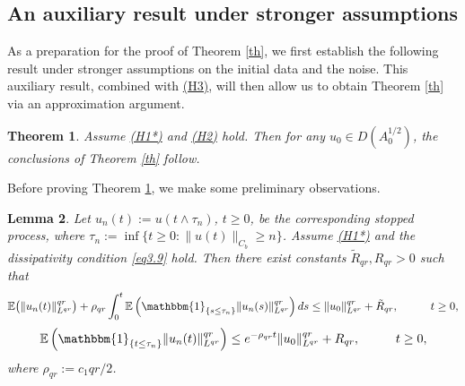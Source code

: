 \documentclass[10pt]{article}
\numberwithin{figure}{section}
\numberwithin{equation}{section}
\newtheorem{theorem}{Theorem}[section]
\newtheorem{lemma}[theorem]{Lemma}
\newcommand{\0}{{\theta}}
\def\O{\Theta}
\def\~{\tilde}
\def\E{\mathbb{E}}
\def\Hs{\hspace{1cm}}\def\hs{\hspace{0.5cm}}
\begin{document}




\subsection{An auxiliary result under stronger assumptions}
As a preparation for the proof of Theorem \ref{th}, we first establish the following result under stronger assumptions on the initial data and the noise. This auxiliary result, combined with \hyperref[H3]{(H3)}, will then allow us to obtain Theorem \ref{th} via an approximation argument.

\begin{theorem}\label{th:global}
Assume \hyperref[H1*]{(H1*)} and \hyperref[H2]{(H2)} hold.
Then for any $u_0 \in D(A_0^{1/2})$, the conclusions of Theorem \ref{th} follow.
\end{theorem}

Before proving Theorem \ref{th:global}, we make some preliminary observations.


\begin{lemma}\label{le4.2} Let $u_n(t) := u(t \wedge \tau_n)$, $t \ge 0$, be the corresponding stopped process, where $\tau_n := \inf\{t \ge 0 : \|u(t)\|_{C_b} \ge n\}$.
 Assume \hyperref[H1*]{(H1*)} and  the dissipativity condition \eqref{eq3.9} hold. 
Then there exist constants $\~R_{qr},R_{qr}>0$ such that 
\begin{equation}\label{eq3.10'}
\mathbb{E}\big(\|u_n(t)\|_{L^{qr}}^{qr}\big)+\rho_{qr}\int_0^t \E\left(\mathbbm{1}_{\{s\le\tau_n\}}\|u_n(s)\|_{L^{qr}}^{qr}\right)ds
\le \|u_0\|_{L^{qr}}^{qr}
+\~R_{qr},\Hs t\ge0,
\end{equation}
\begin{equation}\label{eq:Lq-bound}
\mathbb{E}\left(\mathbbm{1}_{\{t\le\tau_n\}}\|u_n(t)\|_{L^{qr}}^{qr}\right)
\le e^{-\rho_{qr}t}\|u_0\|_{L^{qr}}^{qr}
+R_{qr},\Hs t\ge0,
\end{equation}where $\rho_{qr}:=c_1 qr/2$.
\end{lemma}
\end{document}
